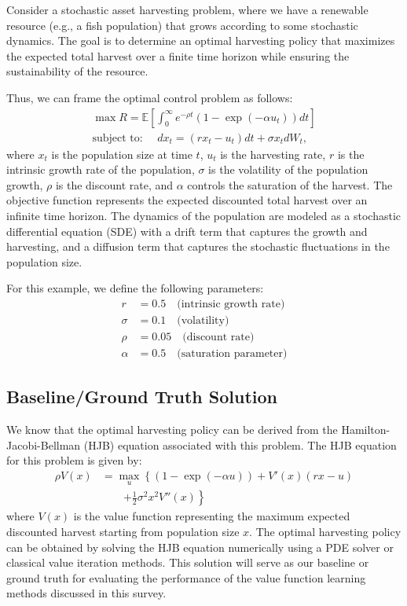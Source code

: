 Consider a stochastic asset harvesting problem, where we have a renewable resource (e.g., a fish population) that grows according to some stochastic dynamics. The goal is to determine an optimal harvesting policy that maximizes the expected total harvest over a finite time horizon while ensuring the sustainability of the resource.

Thus, we can frame the optimal control problem as follows:
\begin{align}
    \max R = \mathbb{E}\left[ \int_{0}^{\infty} e^{-\rho t} (1 - \exp(-\alpha u_{t})) dt \right] \label{eq:harvest:objective}\\
    \text{subject to: } \quad dx_{t} = (r x_{t} - u_{t})dt + \sigma x_{t} dW_{t} \label{eq:harvest:dynamics},
\end{align}
where $x_{t}$ is the population size at time $t$, $u_{t}$ is the harvesting rate, $r$ is the intrinsic growth rate of the population, $\sigma$ is the volatility of the population growth, $\rho$ is the discount rate, and $\alpha$ controls the saturation of the harvest. The objective function represents the expected discounted total harvest over an infinite time horizon. The dynamics of the population are modeled as a stochastic differential equation (SDE) with a drift term that captures the growth and harvesting, and a diffusion term that captures the stochastic fluctuations in the population size.

For this example, we define the following parameters:
\begin{align*}
    r &= 0.5 \quad \text{(intrinsic growth rate)}\\
    \sigma &= 0.1 \quad \text{(volatility)}\\
    \rho &= 0.05 \quad \text{(discount rate)}\\
    \alpha &= 0.5 \quad \text{(saturation parameter)}
\end{align*}

\subsection{Baseline/Ground Truth Solution}
We know that the optimal harvesting policy can be derived from the Hamilton-Jacobi-Bellman (HJB) equation associated with this problem. The HJB equation for this problem is given by:
\begin{align}
    \rho V(x) &= \max_{u} \left\{ (1 - \exp(-\alpha u)) + V'(x)(r x - u) \right.\nonumber\\
    &\qquad \left. + \frac{1}{2} \sigma^2 x^2 V''(x) \right\}\label{eqn:harvest:hjb}
\end{align}
where $V(x)$ is the value function representing the maximum expected discounted harvest starting from population size $x$. The optimal harvesting policy can be obtained by solving the HJB equation numerically using a PDE solver or classical value iteration methods. This solution will serve as our baseline or ground truth for evaluating the performance of the value function learning methods discussed in this survey.

